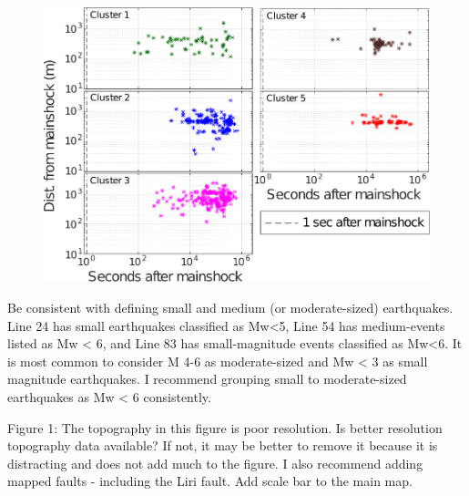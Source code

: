 \documentclass[10pt]{extarticle}
\begin{document}
\begin{Answer}
\begin{figure}[!h]
\begin{center}
 \includegraphics[width=0.8\linewidth]{S3_loglog_time.png} 
\end{center}
\end{figure}
 \WorkInProgressRevTask
\end{Answer}
%
%




\begin{ReviewerComment}{1}
\noindent 
Be consistent with defining small and medium (or moderate-sized) earthquakes. Line 24 has small earthquakes classified as  Mw<5, Line 54 has medium-events listed as Mw < 6, and Line 83 has small-magnitude events classified as Mw<6. It is most common to consider M 4-6 as moderate-sized and Mw < 3 as small magnitude earthquakes. I recommend grouping small to moderate-sized earthquakes as Mw < 6 consistently.

\end{ReviewerComment}


\begin{Answer}
 \WorkInProgressRevTask
\end{Answer}
%
%




\begin{ReviewerComment}{1}
\noindent 
Figure 1: The topography in this figure is poor resolution. Is better resolution topography data available? If not, it may be better to remove it because it is distracting and does not add much to the figure. I also recommend adding mapped faults - including the Liri fault. Add scale bar to the main map.

\end{ReviewerComment}
\end{document}
